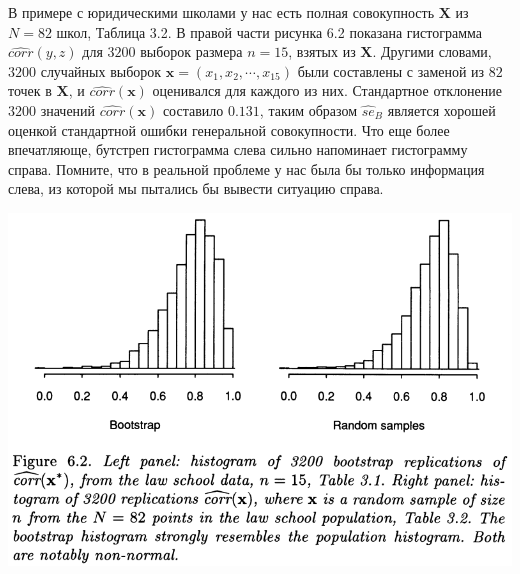 В примере с юридическими школами у нас есть полная совокупность $\mathbf{X}$ из $N = 82$ школ, Таблица 3.2. В правой части рисунка 6.2 показана гистограмма $\widehat{corr} (y, z)$ для $3200$ выборок размера $n = 15$, взятых из $\mathbf{X}$. Другими словами, $3200$ случайных выборок $\mathbf{x} = (x_1, x_2, \cdots, x_{15})$ были составлены с заменой из $82$ точек в $\mathbf{X}$, и $\widehat{corr}(\mathbf{x})$ оценивался для каждого из них. Стандартное отклонение $3200$ значений $\widehat{corr}(\mathbf{x})$ составило $0.131$, таким образом $\widehat{se}_B$ является хорошей оценкой стандартной ошибки генеральной совокупности. Что еще более впечатляюще, бутстреп гистограмма слева сильно напоминает гистограмму справа. Помните, что в реальной проблеме у нас была бы только информация слева, из которой мы пытались бы вывести ситуацию справа. 
\newline

\noindent
\includegraphics[width=\linewidth]{5/f62.png}
\newline